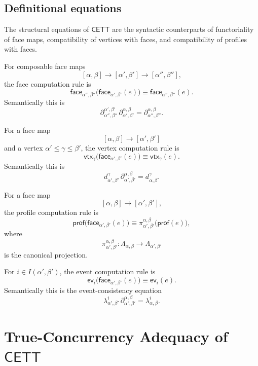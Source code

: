 \subsection{Definitional equations}
\label{subsec:cmett-definitional-equations}

The structural equations of \(\mathsf{CETT}\) are the syntactic counterparts
of functoriality of face maps, compatibility of vertices with faces, and
compatibility of profiles with faces.

For composable face maps
\[
    [\alpha,\beta]\to[\alpha',\beta']\to[\alpha'',\beta''],
\]
the face computation rule is
\[
    \mathsf{face}_{\alpha'',\beta''}
    \bigl(\mathsf{face}_{\alpha',\beta'}(e)\bigr)
    \equiv
    \mathsf{face}_{\alpha'',\beta''}(e).
\]
Semantically this is
\[
    \partial_{\alpha'',\beta''}^{\alpha',\beta'}
    \,
    \partial_{\alpha',\beta'}^{\alpha,\beta}
    =
    \partial_{\alpha'',\beta''}^{\alpha,\beta}.
\]

For a face map
\[
    [\alpha,\beta]\to[\alpha',\beta']
\]
and a vertex \(\alpha'\leq\gamma\leq\beta'\), the vertex computation rule is
\[
    \mathsf{vtx}_{\gamma}
    \bigl(\mathsf{face}_{\alpha',\beta'}(e)\bigr)
    \equiv
    \mathsf{vtx}_{\gamma}(e).
\]
Semantically this is
\[
        d_{\alpha',\beta'}^\gamma
        \,
        \partial_{\alpha',\beta'}^{\alpha,\beta}
        =
        d_{\alpha,\beta}^{\gamma}.
\]

For a face map
\[
    [\alpha,\beta]\to[\alpha',\beta'],
\]
the profile computation rule is
\[
    \mathsf{prof}
    \bigl(\mathsf{face}_{\alpha',\beta'}(e)\bigr)
    \equiv
    \pi_{\alpha',\beta'}^{\alpha,\beta}
    \bigl(\mathsf{prof}(e)\bigr),
\]
where
\[
        \pi_{\alpha',\beta'}^{\alpha,\beta}:
        \Lambda_{\alpha,\beta}\to\Lambda_{\alpha',\beta'}
\]
is the canonical projection.

For \(i\in I(\alpha',\beta')\), the event computation rule is
\[
    \mathsf{ev}_i
    \bigl(\mathsf{face}_{\alpha',\beta'}(e)\bigr)
    \equiv
    \mathsf{ev}_i(e).
\]
Semantically this is the event-consistency equation
\[
        \lambda^i_{\alpha',\beta'}
        \,\partial_{\alpha',\beta'}^{\alpha,\beta}
        =
        \lambda^i_{\alpha,\beta}.
\]

\section{\texorpdfstring{True-Concurrency Adequacy of \(\mathsf{CETT}\)}{}}
\label{sec:cmett-true-concurrency-adequacy-cett}


